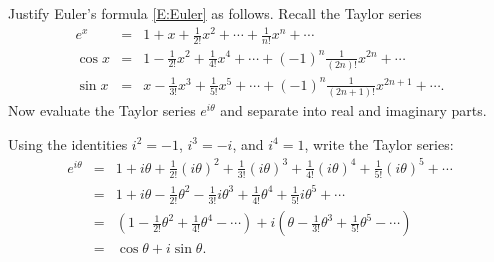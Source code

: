 \documentclass{ximera}
\begin{document}
\begin{exercise}  \label{c6.6.05}
Justify Euler's formula \eqref{E:Euler} as follows.  Recall the
Taylor series
\begin{eqnarray*}
e^x & = & 1 + x + \frac{1}{2!}x^2 + \cdots + \frac{1}{n!}x^n + \cdots\\
\cos x & = & 1 - \frac{1}{2!}x^2 + \frac{1}{4!}x^4 + \cdots +
(-1)^n \frac{1}{(2n)!}x^{2n} + \cdots \\
\sin x & = & x - \frac{1}{3!}x^3 + \frac{1}{5!}x^5 + \cdots +
(-1)^n \frac{1}{(2n+1)!}x^{2n+1} + \cdots.
\end{eqnarray*}
Now evaluate the Taylor series $e^{i\theta}$ and separate into real and
imaginary parts.

\begin{solution}

Using the identities $i^2 = -1$, $i^3 = -i$, and $i^4 = 1$, write
the Taylor series:
\[
\begin{array}{rcl}
e^{i\theta} & = & 1 + i\theta + \frac{1}{2!}(i\theta)^2 +
\frac{1}{3!}(i\theta)^3 + \frac{1}{4!}(i\theta)^4 +
\frac{1}{5!}(i\theta)^5 + \cdots \\
& = & 1 + i\theta - \frac{1}{2!}\theta^2 - \frac{1}{3!}i\theta^3 +
\frac{1}{4!}\theta^4 + \frac{1}{5!}i\theta^5 + \cdots \\
& = & (1 - \frac{1}{2!}\theta^2 + \frac{1}{4!}\theta^4 - \cdots)
+ i(\theta - \frac{1}{3!}\theta^3 + \frac{1}{5!}\theta^5 - \cdots) \\
& = & \cos\theta + i\sin\theta. \end{array}
\]


\end{solution}
\end{exercise}
\end{document}
